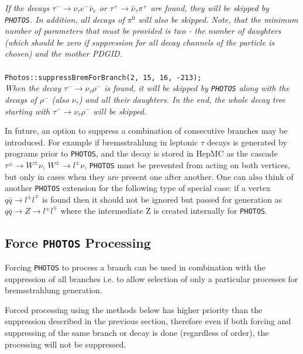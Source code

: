 \documentclass[]{Photos_interface_design}
\begin{document}
\begin{itemize}
\emph{If the decays $\tau^- \rightarrow \nu_\tau e^- \bar \nu_e$ or
      $\tau^+ \rightarrow \bar \nu_\tau \pi^+$ are found, they will be skipped by {\tt PHOTOS}.
	  In addition, all decays of $\pi^0$ will also be skipped. Note, that the minimum
	  number of parameters that must be provided is two - the number of daughters
	  (which should be zero if suppression for all decay channels of the particle is chosen) 
	  and the mother PDGID.} \\ \\
{\tt Photos::suppressBremForBranch(2, 15, 16, -213); } \\
\emph{When the decay $\tau^- \rightarrow \nu_\tau \rho^-$ is found, it will be skipped by
      {\tt PHOTOS} along with the decays of   $\rho^-$ 
(also $\nu_\tau$) and all
	  their daughters. In the end, the whole decay tree starting with
	  $\tau^- \rightarrow \nu_\tau \rho^-$ will be skipped.}
\end{itemize}

In future, an option to suppress a combination of consecutive branches may be introduced.
For example if bremsstrahlung in leptonic $\tau$ decays is generated by
programs prior to {\tt PHOTOS}, and the decay is stored in HepMC as the cascade
$\tau^\pm \to W^\pm \nu$, $W^\pm \to l^\pm \nu$, {\tt PHOTOS} must
be prevented from acting on both vertices, but only in cases when they are present one after another.
One can also think of another {\tt PHOTOS} extension for the following type of special case: if a vertex $q
\bar q \to l^\pm l^\mp$ is found then it should not be ignored but
passed for generation as $q \bar q \to Z \to l^\pm l^\mp$ where
the intermediate Z is created internally for {\tt PHOTOS}.

\subsection{Force {\tt PHOTOS} Processing }
\label{section:force}

Forcing {\tt PHOTOS} to process a branch can be used in combination with
the suppression of all branches i.e. to allow selection of only a particular
processes for bremsstrahlung generation.

Forced processing using the methods below has higher priority than the suppression described
in the previous section, therefore even if both forcing and suppressing of the same
branch or decay is done (regardless of order), the processing will not be
suppressed.
\end{document}
